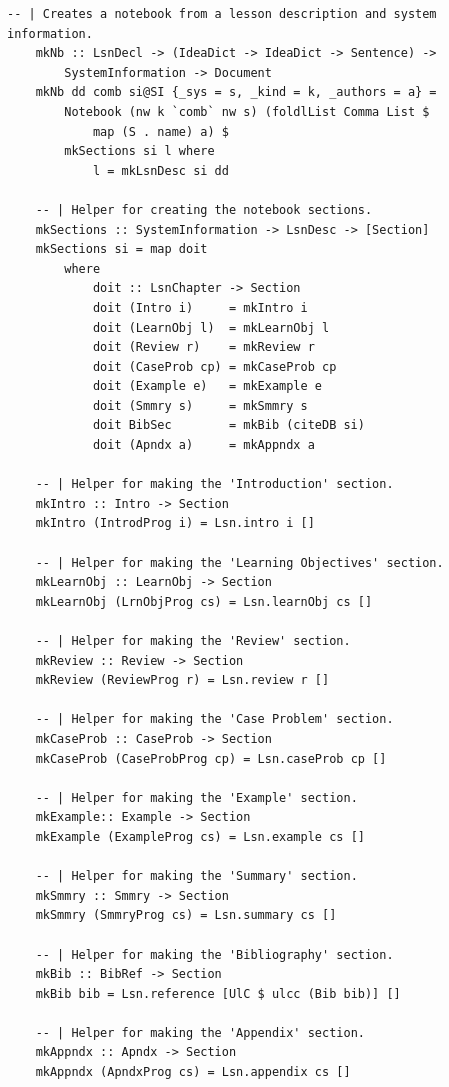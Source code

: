 \newpage

\begin{lstlisting}[language=haskell1, 
	basicstyle=\linespread{1.1}\small\ttfamily]
	-- | Creates a notebook from a lesson description and system information.
	mkNb :: LsnDecl -> (IdeaDict -> IdeaDict -> Sentence) -> 
		SystemInformation -> Document
	mkNb dd comb si@SI {_sys = s, _kind = k, _authors = a} =
		Notebook (nw k `comb` nw s) (foldlList Comma List $ 
			map (S . name) a) $
		mkSections si l where
			l = mkLsnDesc si dd
	
	-- | Helper for creating the notebook sections.
	mkSections :: SystemInformation -> LsnDesc -> [Section]
	mkSections si = map doit  
		where
			doit :: LsnChapter -> Section
			doit (Intro i)     = mkIntro i
			doit (LearnObj l)  = mkLearnObj l
			doit (Review r)    = mkReview r
			doit (CaseProb cp) = mkCaseProb cp
			doit (Example e)   = mkExample e
			doit (Smmry s)     = mkSmmry s
			doit BibSec        = mkBib (citeDB si)
			doit (Apndx a)     = mkAppndx a
	
	-- | Helper for making the 'Introduction' section.
	mkIntro :: Intro -> Section
	mkIntro (IntrodProg i) = Lsn.intro i []
	
	-- | Helper for making the 'Learning Objectives' section.
	mkLearnObj :: LearnObj -> Section
	mkLearnObj (LrnObjProg cs) = Lsn.learnObj cs []
	
	-- | Helper for making the 'Review' section.
	mkReview :: Review -> Section
	mkReview (ReviewProg r) = Lsn.review r [] 
	
	-- | Helper for making the 'Case Problem' section.
	mkCaseProb :: CaseProb -> Section
	mkCaseProb (CaseProbProg cp) = Lsn.caseProb cp [] 
	
	-- | Helper for making the 'Example' section.
	mkExample:: Example -> Section
	mkExample (ExampleProg cs) = Lsn.example cs []
	
	-- | Helper for making the 'Summary' section.
	mkSmmry :: Smmry -> Section
	mkSmmry (SmmryProg cs) = Lsn.summary cs []
	
	-- | Helper for making the 'Bibliography' section.
	mkBib :: BibRef -> Section
	mkBib bib = Lsn.reference [UlC $ ulcc (Bib bib)] []
	
	-- | Helper for making the 'Appendix' section.
	mkAppndx :: Apndx -> Section
	mkAppndx (ApndxProg cs) = Lsn.appendix cs []
\end{lstlisting}

